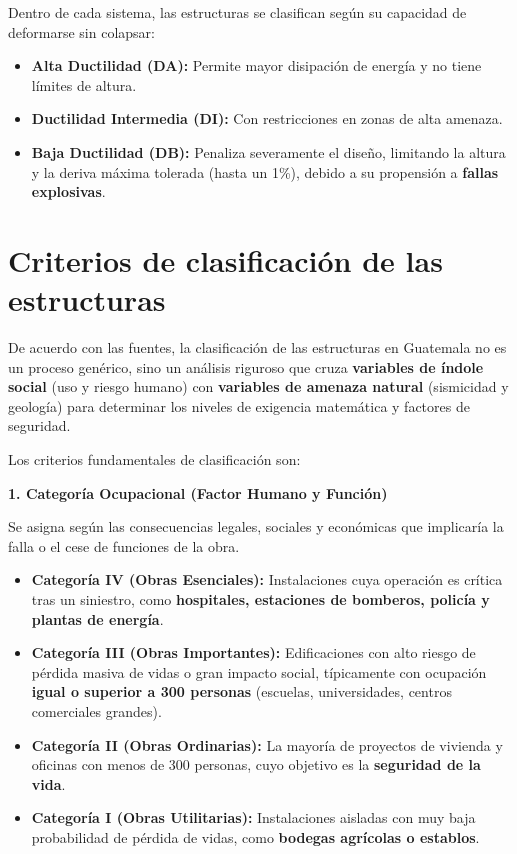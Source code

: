 \documentclass[14pt,letterpaper]{extarticle}
\begin{document}
	Dentro de cada sistema, las estructuras se clasifican según su capacidad de deformarse sin colapsar:
	
	\begin{itemize}
		\item \textbf{Alta Ductilidad (DA):} Permite mayor disipación de energía y no tiene límites de altura.
		
		\item \textbf{Ductilidad Intermedia (DI):} Con restricciones en zonas de alta amenaza.
		
		\item \textbf{Baja Ductilidad (DB):} Penaliza severamente el diseño, limitando la altura y la deriva máxima tolerada (hasta un 1\%), debido a su propensión a \textbf{fallas explosivas}.
	\end{itemize}

	
	
	\newpage
	\section{Criterios de clasificación de las estructuras}
	
	De acuerdo con las fuentes, la clasificación de las estructuras en Guatemala no es un proceso genérico, sino un análisis riguroso que cruza \textbf{variables de índole social} (uso y riesgo humano) con \textbf{variables de amenaza natural} (sismicidad y geología) para determinar los niveles de exigencia matemática y factores de seguridad.
	
	Los criterios fundamentales de clasificación son:
	
	\textbf{1. Categoría Ocupacional (Factor Humano y Función)}
	
	Se asigna según las consecuencias legales, sociales y económicas que implicaría la falla o el cese de funciones de la obra.
	
	\begin{itemize}
		\item \textbf{Categoría IV (Obras Esenciales):} Instalaciones cuya operación es crítica tras un siniestro, como \textbf{hospitales, estaciones de bomberos, policía y plantas de energía}.
		
		\item \textbf{Categoría III (Obras Importantes):} Edificaciones con alto riesgo de pérdida masiva de vidas o gran impacto social, típicamente con ocupación \textbf{igual o superior a 300 personas} (escuelas, universidades, centros comerciales grandes).
		
		\item \textbf{Categoría II (Obras Ordinarias):} La mayoría de proyectos de vivienda y oficinas con menos de 300 personas, cuyo objetivo es la \textbf{seguridad de la vida}.
		
		\item \textbf{Categoría I (Obras Utilitarias):} Instalaciones aisladas con muy baja probabilidad de pérdida de vidas, como \textbf{bodegas agrícolas o establos}.
	\end{itemize}
	
\end{document}
